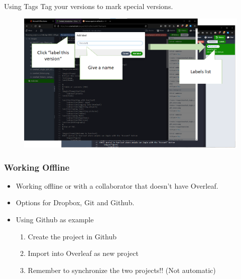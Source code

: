 \documentclass[aspectratio=169]{beamer}
\begin{document}
\begin{frame}{Using Tags}
    Tag your versions to mark special versions.
    \begin{figure}
        \centering
        \includegraphics[scale=0.35]{images/overleaf_hist_tag_3.png}
        \label{fig:history_tags}
    \end{figure}
\end{frame}

\begin{frame}[fragile]
\frametitle{Working Offline}

    \begin{itemize}
        \item Working offline or with a collaborator that doesn't have Overleaf.
        \item Options for Dropbox, Git and Github.
        \item Using Github as example
        \begin{enumerate}
            \item Create the project in Github
            \item Import into Overleaf as new project
            \item Remember to synchronize the two projects!! (Not automatic)
        \end{enumerate}
    \end{itemize}
\end{frame}
\end{document}
